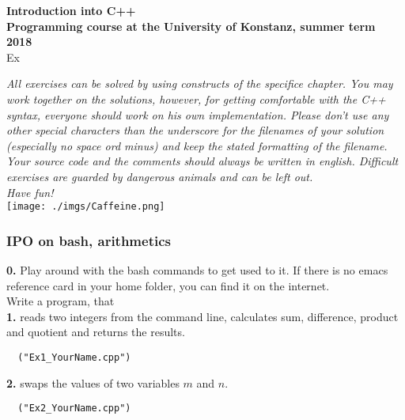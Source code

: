 \documentclass[paper=A4, pagesize, DIV=calc, smallheadings,
fontsize=11pt, expansion=false]{scrreprt}
\begin{document}
\pagestyle{empty}
\huge
\begin{center}
\textbf{Introduction into C++}\\
\Large
\textbf{Programming course at the University of Konstanz, summer term 2018}\\
\large{Ex}
\end{center}
\normalsize
\textit{All exercises can be solved by using constructs of the specifice chapter. 
You may work together on the solutions, however, for getting comfortable with the C++ syntax, everyone should work on his own 
implementation. Please don't use any other special characters than the underscore for the filenames of your solution (especially no space ord minus) and keep the stated formatting of the filename.
Your source code and the comments should always be written in english.
Difficult exercises are guarded by dangerous animals and can be left out. 
\\
Have fun!
}\\
\vspace{2em}\hspace*{30em}
\texttt{[image: ./imgs/Caffeine.png]}
\large
\normalsize
\subsubsection*{IPO on bash, arithmetics}
\textbf{0.} 
Play around with the bash commands to get used to it. If there is no emacs reference card in your home folder, you can find it on the internet.
\vspace{.5em}
\\
Write a program, that\\
\textbf{1.} 
 reads two integers from the command line, calculates sum, difference, product and quotient and returns the results.
\begin{verbatim}
  ("Ex1_YourName.cpp")
\end{verbatim}

\textbf{2.}
 swaps the values of two variables $m$ and $n.$
\begin{verbatim}
  ("Ex2_YourName.cpp")
\end{verbatim}
\end{document}
